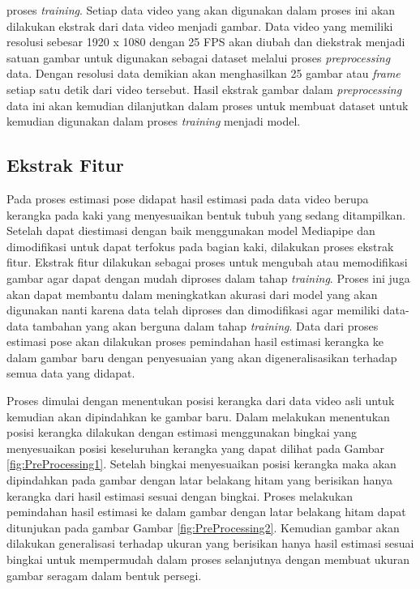 \noindent
proses \emph{training}. Setiap data video yang akan digunakan dalam proses ini akan dilakukan ekstrak dari data video menjadi gambar. Data video yang memiliki resolusi sebesar 1920 x 1080 dengan 25 FPS akan diubah dan diekstrak menjadi satuan gambar untuk digunakan sebagai dataset melalui proses \emph{preprocessing} data. Dengan resolusi data demikian akan menghasilkan 25 gambar atau \emph{frame} setiap satu detik dari video tersebut. Hasil ekstrak gambar dalam \emph{preprocessing} data ini akan kemudian dilanjutkan dalam proses untuk membuat dataset untuk kemudian digunakan dalam proses \emph{training} menjadi model.

\subsection{Ekstrak Fitur}
\label{subsec:AugmentasiData}

Pada proses estimasi pose didapat hasil estimasi pada data video berupa kerangka pada kaki yang menyesuaikan bentuk tubuh yang sedang ditampilkan. Setelah dapat diestimasi dengan baik menggunakan model Mediapipe dan dimodifikasi untuk dapat terfokus pada bagian kaki, dilakukan proses ekstrak fitur. Ekstrak fitur dilakukan sebagai proses untuk mengubah atau memodifikasi gambar agar dapat dengan mudah diproses dalam tahap \emph{training}. Proses ini juga akan dapat membantu dalam meningkatkan akurasi dari model yang akan digunakan nanti karena data telah diproses dan dimodifikasi agar memiliki data-data tambahan yang akan berguna dalam tahap \emph{training}. Data dari proses estimasi pose akan dilakukan proses pemindahan hasil estimasi kerangka ke dalam gambar baru dengan penyesuaian yang akan digeneralisasikan terhadap semua data yang didapat. 

Proses dimulai dengan menentukan posisi kerangka dari data video asli untuk kemudian akan dipindahkan ke gambar baru. Dalam melakukan menentukan posisi kerangka dilakukan dengan estimasi menggunakan bingkai yang menyesuaikan posisi keseluruhan kerangka yang dapat dilihat pada Gambar \ref{fig:PreProcessing1}. Setelah bingkai menyesuaikan posisi kerangka maka akan dipindahkan pada gambar dengan latar belakang hitam yang berisikan hanya kerangka dari hasil estimasi sesuai dengan bingkai. Proses melakukan pemindahan hasil estimasi ke dalam gambar dengan latar belakang hitam dapat ditunjukan pada gambar Gambar \ref{fig:PreProcessing2}. Kemudian gambar akan dilakukan generalisasi terhadap ukuran yang berisikan hanya hasil estimasi sesuai bingkai untuk mempermudah dalam proses selanjutnya dengan membuat ukuran gambar seragam dalam bentuk persegi.

